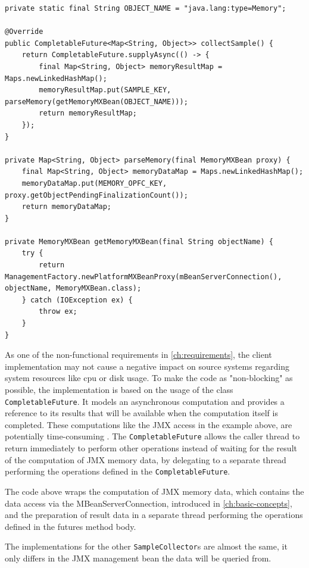 \begin{lstlisting}[caption={MemorySampleCollector collectSample()}, captionpos=b, label={lst:memory-sample-collect}]
private static final String OBJECT_NAME = "java.lang:type=Memory";

@Override
public CompletableFuture<Map<String, Object>> collectSample() {
    return CompletableFuture.supplyAsync(() -> {
        final Map<String, Object> memoryResultMap = Maps.newLinkedHashMap();
        memoryResultMap.put(SAMPLE_KEY, parseMemory(getMemoryMXBean(OBJECT_NAME)));
        return memoryResultMap;
    });
}

private Map<String, Object> parseMemory(final MemoryMXBean proxy) {
    final Map<String, Object> memoryDataMap = Maps.newLinkedHashMap();
    memoryDataMap.put(MEMORY_OPFC_KEY, proxy.getObjectPendingFinalizationCount());
    return memoryDataMap;
}

private MemoryMXBean getMemoryMXBean(final String objectName) {
    try {
        return ManagementFactory.newPlatformMXBeanProxy(mBeanServerConnection(), objectName, MemoryMXBean.class);
    } catch (IOException ex) {
        throw ex;
    }
}
\end{lstlisting}

As one of the non-functional requirements in \autoref{ch:requirements}, the client implementation may not cause a negative impact
on source systems regarding system resources like cpu or disk usage. To make the code as "non-blocking" as possible,
the implementation is based on the usage of the class \verb|CompletableFuture|. It models an asynchronous computation and provides
a reference to its results that will be available when the computation itself is completed. These computations like the JMX
access in the example above, are potentially time-consuming \cite{Java8}. The \verb|CompletableFuture| allows the caller thread to return immediately
to perform other operations instead of waiting for the result of the computation of JMX memory data, by delegating to a
separate thread performing the operations defined in the \verb|CompletableFuture|.

The code above wraps the computation of JMX memory data, which contains the data access via the MBeanServerConnection,
introduced in \autoref{ch:basic-concepts}, and the preparation of result data in a separate thread performing the operations defined
in the futures method body.

The implementations for the other \verb|SampleCollector|s are almost the same, it only differs in the JMX management bean the data will
be queried from.

